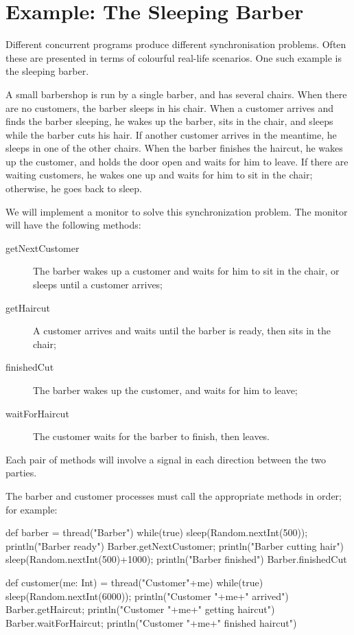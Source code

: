 \section{Example: The Sleeping Barber}

Different concurrent programs produce different synchronisation problems.
Often these are presented in terms of colourful real-life scenarios.  One such
example is the sleeping barber.

A small barbershop is run by a single barber, and has several chairs.  When
there are no customers, the barber sleeps in his chair.  When a customer
arrives and finds the barber sleeping, he wakes up the barber, sits in the
chair, and sleeps while the barber cuts his hair.  If another customer arrives
in the meantime, he sleeps in one of the other chairs.  When the barber
finishes the haircut, he wakes up the customer, and holds the door open and
waits for him to leave.  If there are waiting customers, he wakes one up and
waits for him to sit in the chair; otherwise, he goes back to sleep.


\begin{slide}

We will implement a monitor to solve this synchronization problem.  The
monitor will have the following methods:
%
\begin{description}
\item[getNextCustomer]
The barber wakes up a customer and waits for him to sit in the chair, or
sleeps until a customer arrives;

\item[getHaircut]
A customer arrives and waits until the barber is ready, then sits in the
chair;

\item[finishedCut]
The barber wakes up the customer, and waits for him to leave;

\item[waitForHaircut]
The customer waits for the barber to finish, then leaves.
\end{description}
%
Each pair of methods will involve a signal in each direction between the two
parties.
\end{slide}

\begin{slide}

The barber and customer processes must call the appropriate methods in order;
for example:
%
\begin{scala}
  def barber = thread("Barber"){
    while(true){
      sleep(Random.nextInt(500)); println("Barber ready")
      Barber.getNextCustomer; println("Barber cutting hair")
      sleep(Random.nextInt(500)+1000); println("Barber finished")
      Barber.finishedCut
  } }

  def customer(me: Int) = thread("Customer"+me){
    while(true){
      sleep(Random.nextInt(6000)); println("Customer "+me+" arrived")
      Barber.getHaircut; println("Customer "+me+" getting haircut")
      Barber.waitForHaircut; println("Customer "+me+" finished haircut")
  } }
\end{scala}
\end{slide}

